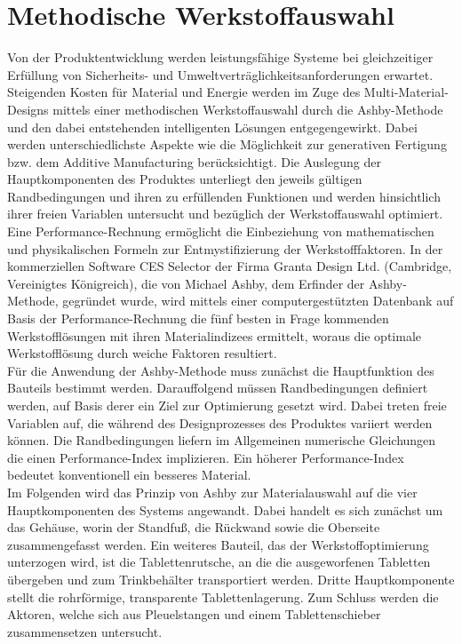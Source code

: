 
\chapter{Methodische Werkstoffauswahl}
Von der Produktentwicklung werden leistungsfähige Systeme bei gleichzeitiger Erfüllung von Sicherheits- und Umweltverträglichkeitsanforderungen erwartet. Steigenden Kosten für Material und Energie werden im Zuge des Multi-Material-Designs mittels einer methodischen Werkstoffauswahl durch die \glqq Ashby-Methode\glqq{} und den dabei entstehenden intelligenten Lösungen entgegengewirkt. Dabei werden unterschiedlichste Aspekte wie die Möglichkeit zur generativen Fertigung bzw. dem Additive Manufacturing berücksichtigt. Die Auslegung der Hauptkomponenten des Produktes unterliegt den jeweils gültigen Randbedingungen und ihren zu erfüllenden Funktionen und werden hinsichtlich ihrer freien Variablen untersucht und bezüglich der Werkstoffauswahl optimiert. Eine \glqq Performance-Rechnung\grqq{} ermöglicht die Einbeziehung von mathematischen und physikalischen Formeln zur Entmystifizierung der Werkstofffaktoren. In der kommerziellen Software CES Selector der Firma Granta Design Ltd. (Cambridge, Vereinigtes Königreich), die von Michael Ashby, dem Erfinder der Ashby-Methode, gegründet wurde, wird mittels einer computergestützten Datenbank auf Basis der Performance-Rechnung die fünf besten in Frage kommenden Werkstofflösungen mit ihren Materialindizees ermittelt, woraus die optimale Werkstofflösung durch \glqq weiche\grqq{} Faktoren resultiert.\\
Für die Anwendung der Ashby-Methode muss zunächst die Hauptfunktion des Bauteils bestimmt werden. Darauffolgend müssen Randbedingungen definiert werden, auf Basis derer ein Ziel zur Optimierung gesetzt wird. Dabei treten freie Variablen auf, die während des Designprozesses des Produktes variiert werden können. Die Randbedingungen liefern im Allgemeinen numerische Gleichungen die einen Performance-Index implizieren. Ein höherer Performance-Index bedeutet konventionell ein besseres Material.\\
Im Folgenden wird das Prinzip von Ashby zur Materialauswahl auf die vier Hauptkomponenten des Systems angewandt. Dabei handelt es sich zunächst um das Gehäuse, worin der Standfuß, die Rückwand sowie die Oberseite zusammengefasst werden. Ein weiteres Bauteil, das der Werkstoffoptimierung unterzogen wird, ist die Tablettenrutsche, an die die ausgeworfenen Tabletten übergeben und zum Trinkbehälter transportiert werden. Dritte Hauptkomponente stellt die rohrförmige, transparente Tablettenlagerung. Zum Schluss werden die Aktoren, welche sich aus Pleuelstangen und einem Tablettenschieber zusammensetzen untersucht.

